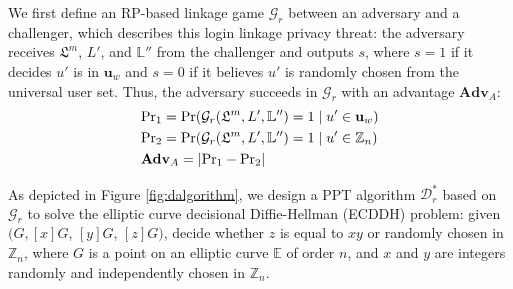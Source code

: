 We first define an RP-based linkage game $\mathcal{G}_r$ between an adversary and a challenger, which describes this login linkage privacy threat: the adversary receives $\mathfrak{L}^m$, $L'$, and $\mathbb{L}''$ from the challenger and outputs $s$, where $s = 1$ if it decides $u'$ is in $\mathbf{u}_w$ %
and $s=0$ if it believes $u'$ is randomly chosen from the universal user set.
Thus, the adversary succeeds in $\mathcal{G}_r$ with an advantage $\mathbf{Adv}_{A}$:
\begin{align*}
&{\rm Pr}_1={\rm Pr}(\mathcal{G}_r(\mathfrak{L}^m, L', \mathbb{L}'')=1 \;| \; u' \in \mathbf{u}_w)  \\
&{\rm Pr}_2={\rm Pr}(\mathcal{G}_r(\mathfrak{L}^m, L', \mathbb{L}'')=1 \; | \; u' \in \mathbb{Z}_n)\\
&{\mathbf{Adv}}_{A}=|{\rm Pr}_1-{\rm Pr}_2|
\end{align*}

As depicted in Figure \ref{fig:dalgorithm}, we design a PPT algorithm $\mathcal{D}^*_r$ based on $\mathcal{G}_r$ to solve the elliptic curve decisional Diffie-Hellman (ECDDH) problem: given $(G, [x]G$, $[y]G$, $[z]G)$, decide whether $z$ is equal to $xy$ or randomly chosen in $\mathbb{Z}_n$, where $G$ is a point on an elliptic curve $\mathbb{E}$ of order $n$, and $x$ and $y$ are integers randomly and independently chosen in $\mathbb{Z}_n$.


